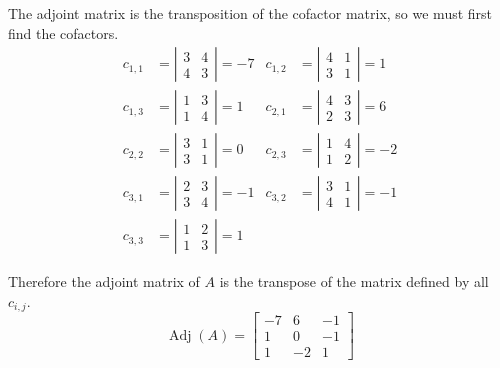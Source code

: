 \documentclass[fleqn]{article}
\newenvironment{answers}{ %
	\begin{enumerate}
		\setlength{\itemsep}{\bigskipamount}
}{\end{enumerate}}
\newcommand{\Adj}{\operatorname{Adj}}
\begin{document}
\begin{answers}
\begin{enumerate}
				The adjoint matrix is the transposition of the cofactor matrix, so we must first find the cofactors.
				\begin{align*}
					c_{1,1} & = \left|\begin{matrix} 3 & 4 \\ 4 & 3 \end{matrix}\right| = -7  &
					c_{1,2} & = \left|\begin{matrix} 4 & 1 \\ 3 & 1 \end{matrix}\right| = 1 \\
					c_{1,3} & = \left|\begin{matrix} 1 & 3 \\ 1 & 4 \end{matrix}\right| = 1  &
					c_{2,1} & = \left|\begin{matrix} 4 & 3 \\ 2 & 3 \end{matrix}\right| = 6 \\
					c_{2,2} & = \left|\begin{matrix} 3 & 1 \\ 3 & 1 \end{matrix}\right| = 0  &
					c_{2,3} & = \left|\begin{matrix} 1 & 4 \\ 1 & 2 \end{matrix}\right| = -2 \\
					c_{3,1} & = \left|\begin{matrix} 2 & 3 \\ 3 & 4 \end{matrix}\right| = -1 &
					c_{3,2} & = \left|\begin{matrix} 3 & 1 \\ 4 & 1 \end{matrix}\right| = -1 \\
					c_{3,3} & = \left|\begin{matrix} 1 & 2 \\ 1 & 3 \end{matrix}\right| = 1
				\end{align*}

				Therefore the adjoint matrix of \(A\) is the transpose of the matrix defined by all \(c_{i,j}\).
				\begin{equation*}
					\Adj(A) = \left[ \begin{matrix}
							-7 & 6  & -1 \\
							1  & 0  & -1 \\
							1  & -2 & 1
						\end{matrix} \right]
				\end{equation*}


\end{enumerate}
\end{answers}
\end{document}

